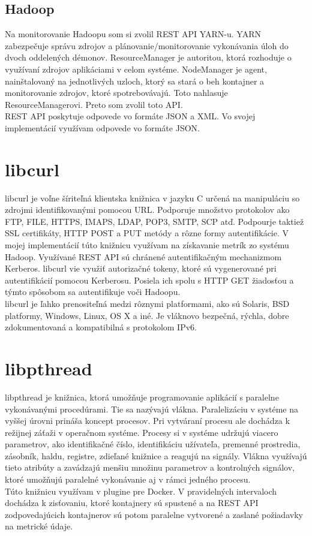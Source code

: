 \documentclass[12pt,twoside,color,cover,table]{fithesis3}
\begin{document}
\subsection{Hadoop}
Na monitorovanie Hadoopu som si zvolil REST API YARN-u. YARN zabezpečuje správu zdrojov a plánovanie/monitorovanie vykonávania úloh do dvoch
oddelených démonov.%
ResourceManager je autoritou, ktorá rozhoduje o využívaní zdrojov aplikáciami v celom systéme. NodeManager
je agent, nainštalovaný na jednotlivých uzloch, ktorý sa stará o beh kontajner a monitorovanie zdrojov, ktoré spotrebovávajú. Toto
nahlasuje ResourceManagerovi. Preto som zvolil toto API.
\\REST API poskytuje odpovede vo formáte JSON a XML. Vo svojej implementácií využívam odpovede vo formáte JSON.

\section{libcurl}
libcurl je voľne šíriteľná klientska knižnica v jazyku C určená na manipuláciu so zdrojmi identifikovanými pomocou URL. Podporuje
množstvo protokolov ako FTP, FILE, HTTPS, IMAPS, LDAP, POP3, SMTP, SCP atď. Podpourje taktiež SSL certifikáty,
HTTP POST a PUT metódy a rôzne formy autentifikácie. V mojej implementácií túto knižnicu využívam na získavanie metrík zo systému
Hadoop. Využívané REST API sú chránené autentifikačným mechanizmom Kerberos. libcurl vie využiť autorizačné tokeny,
ktoré sú vygenerované pri autentifikácií pomocou Kerberosu. Posiela ich spolu s HTTP GET žiadosťou a týmto spôsobom
sa autentifikuje voči Hadoopu.
\\libcurl je ľahko prenositeľná medzi rôznymi platformami, ako sú Solaris, BSD platformy, Windows, Linux, OS X a iné. Je vláknovo
bezpečná, rýchla, dobre zdokumentovaná a kompatibilná s protokolom IPv6. %

\section{libpthread}
libpthread je knižnica, ktorá umožňuje programovanie aplikácií s paralelne vykonávanými procedúrami. Tie sa nazývajú vlákna. Paralelizáciu
v systéme na vyššej úrovni prináša koncept procesov. Pri
vytváraní procesu ale dochádza k režijnej záťaži v operačnom systéme. Procesy si v systéme udržujú viacero parametrov, ako identifikačné
číslo, identifikáciu užívateľa, premenné prostredia, zásobník, haldu, registre, zdieľané knižnice a reagujú na signály. Vlákna využívajú
tieto atribúty a zavádzajú menšiu množinu parametrov a kontrolných signálov, ktoré umožňujú paralelné vykonávanie aj v rámci jedného procesu.
\\Túto knižnicu využívam v plugine pre Docker. V pravidelných intervaloch dochádza k zisťovaniu, ktoré kontajnery sú spustené a na REST API
zodpovedajúcich kontajnerov sú potom paralelne vytvorené a zaslané požiadavky na metrické údaje.
\end{document}

